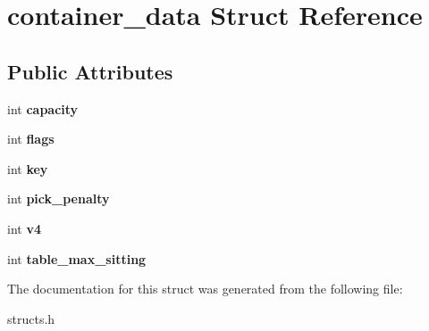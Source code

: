 \hypertarget{structcontainer__data}{\section{container\-\_\-data Struct Reference}
\label{structcontainer__data}
}
\subsection*{Public Attributes}
\begin{DoxyCompactItemize}
\item 
\hypertarget{structcontainer__data_a7f9198aeb60e129115f0f00177d26e67}{int {\bfseries capacity}}\label{structcontainer__data_a7f9198aeb60e129115f0f00177d26e67}

\item 
\hypertarget{structcontainer__data_ab6059deaad4527f19157dc8331cd22a0}{int {\bfseries flags}}\label{structcontainer__data_ab6059deaad4527f19157dc8331cd22a0}

\item 
\hypertarget{structcontainer__data_a475cdb05b8ddd3b37f9d632e71307c8b}{int {\bfseries key}}\label{structcontainer__data_a475cdb05b8ddd3b37f9d632e71307c8b}

\item 
\hypertarget{structcontainer__data_a48c09938bd258627bb48d7c8f0e4c970}{int {\bfseries pick\-\_\-penalty}}\label{structcontainer__data_a48c09938bd258627bb48d7c8f0e4c970}

\item 
\hypertarget{structcontainer__data_a22bd3b03c4df68b04ba4801762f47cd9}{int {\bfseries v4}}\label{structcontainer__data_a22bd3b03c4df68b04ba4801762f47cd9}

\item 
\hypertarget{structcontainer__data_a342757f1dd74bddb200a8bfaa6e96d3a}{int {\bfseries table\-\_\-max\-\_\-sitting}}\label{structcontainer__data_a342757f1dd74bddb200a8bfaa6e96d3a}

\end{DoxyCompactItemize}


The documentation for this struct was generated from the following file\-:\begin{DoxyCompactItemize}
\item 
structs.\-h\end{DoxyCompactItemize}
